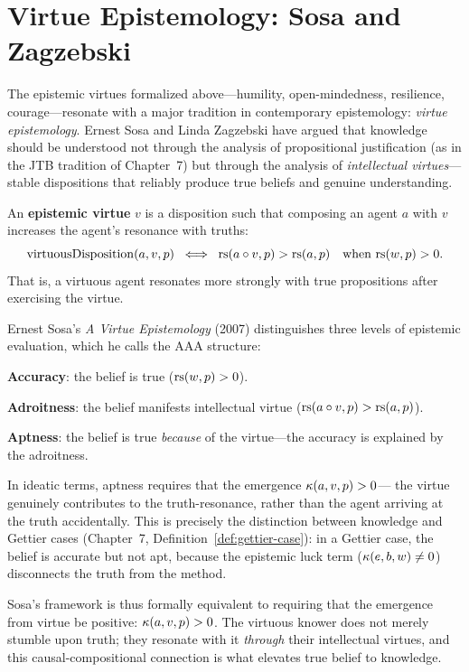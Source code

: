\section{Virtue Epistemology: Sosa and Zagzebski}

The epistemic virtues formalized above---humility, open-mindedness, resilience,
courage---resonate with a major tradition in contemporary epistemology: \emph{virtue
epistemology}. Ernest Sosa and Linda Zagzebski have argued that knowledge should
be understood not through the analysis of propositional justification (as in the
JTB tradition of Chapter~7) but through the analysis of \emph{intellectual virtues}---
stable dispositions that reliably produce true beliefs and genuine understanding.

\begin{definition}
\label{def:epistemic-virtue-general}
An \textbf{epistemic virtue} $v$ is a disposition such that composing an agent $a$
with $v$ increases the agent's resonance with truths:
\[
  \mathrm{virtuousDisposition}(a, v, p) \;\iff\;
  \mathrm{rs}(a \circ v, p) > \mathrm{rs}(a, p) \quad\text{when } \mathrm{rs}(w, p) > 0.
\]
That is, a virtuous agent resonates more strongly with true propositions after
exercising the virtue.
\end{definition}

\begin{interpretation}
Ernest Sosa's \emph{A Virtue Epistemology} (2007) distinguishes three levels of
epistemic evaluation, which he calls the AAA structure:

\textbf{Accuracy}: the belief is true ($\mathrm{rs}(w, p) > 0$).

\textbf{Adroitness}: the belief manifests intellectual virtue ($\mathrm{rs}(a \circ v, p) > \mathrm{rs}(a, p)$).

\textbf{Aptness}: the belief is true \emph{because} of the virtue---the accuracy
is explained by the adroitness.

In ideatic terms, aptness requires that the emergence $\kappa(a, v, p) > 0$---
the virtue genuinely contributes to the truth-resonance, rather than the agent
arriving at the truth accidentally. This is precisely the distinction between
knowledge and Gettier cases (Chapter~7, Definition~\ref{def:gettier-case}):
in a Gettier case, the belief is accurate but not apt, because the epistemic
luck term ($\kappa(e, b, w) \neq 0$) disconnects the truth from the method.

Sosa's framework is thus formally equivalent to requiring that the emergence from
virtue be positive: $\kappa(a, v, p) > 0$. The virtuous knower does not merely
stumble upon truth; they resonate with it \emph{through} their intellectual virtues,
and this causal-compositional connection is what elevates true belief to knowledge.
\end{interpretation}

